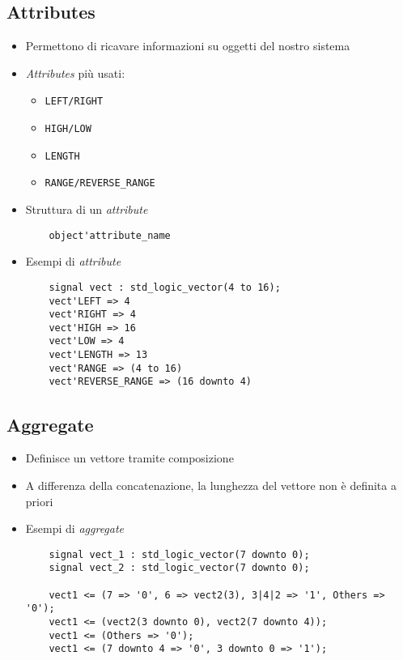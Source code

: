 \documentclass{article}
\begin{document}
\subsection{Attributes} \label{attributes}
\begin{itemize}
  \item Permettono di ricavare informazioni su oggetti del nostro sistema
  \item \textit{Attributes} più usati:
        \begin{itemize}
          \item \texttt{LEFT/RIGHT}
          \item \texttt{HIGH/LOW}
          \item \texttt{LENGTH}
          \item \texttt{RANGE/REVERSE\_RANGE}
        \end{itemize}

        \newpage

  \item Struttura di un \textit{attribute}
        \begin{verbatim}
    object'attribute_name
	      \end{verbatim}
  \item Esempi di \textit{attribute}
        \begin{verbatim}
    signal vect : std_logic_vector(4 to 16);
    vect'LEFT => 4
    vect'RIGHT => 4
    vect'HIGH => 16
    vect'LOW => 4
    vect'LENGTH => 13
    vect'RANGE => (4 to 16)
    vect'REVERSE_RANGE => (16 downto 4)
	      \end{verbatim}
\end{itemize}




\subsection{Aggregate} \label{aggregates}
\begin{itemize}
  \item Definisce un vettore tramite composizione
  \item A differenza della concatenazione, la lunghezza del vettore non è definita a priori

  \item Esempi di \textit{aggregate}
        \begin{verbatim}
    signal vect_1 : std_logic_vector(7 downto 0);
    signal vect_2 : std_logic_vector(7 downto 0);

    vect1 <= (7 => '0', 6 => vect2(3), 3|4|2 => '1', Others => '0');
    vect1 <= (vect2(3 downto 0), vect2(7 downto 4));
    vect1 <= (Others => '0');
    vect1 <= (7 downto 4 => '0', 3 downto 0 => '1');
	      \end{verbatim}
\end{itemize}
\end{document}
